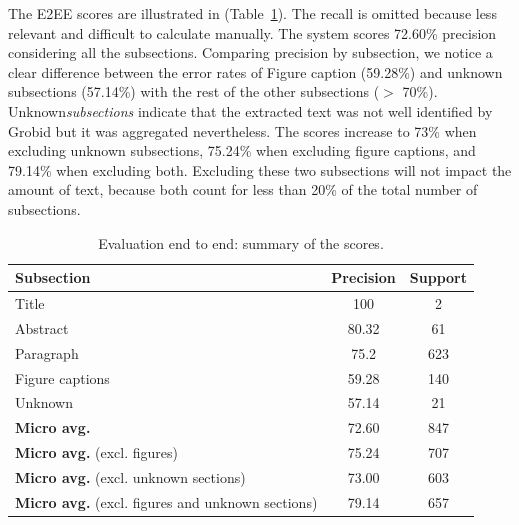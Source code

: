 \documentclass[]{interact}
\theoremstyle{plain}%
\theoremstyle{definition}
\theoremstyle{remark}
\begin{document}
The E2EE scores are illustrated in (Table~\ref{table:end2end-evaluation-summary}).
The recall is omitted because less relevant and difficult to calculate manually.
The system scores 72.60\% precision considering all the subsections.
Comparing precision by subsection, we notice a clear difference between the error rates of Figure caption (59.28\%) and unknown subsections (57.14\%) with the rest of the other subsections ($>$ 70\%).
Unknown\textit{subsections} indicate that the extracted text was not well identified by Grobid but it was aggregated nevertheless.
The scores increase to 73\% when excluding unknown subsections, 75.24\% when excluding figure captions, and 79.14\%  when excluding both.
Excluding these two subsections will not impact the amount of text, because both count for less than 20\% of the total number of subsections.


\begin{table}[ht]
    \centering\small
    \begin{tabular}{l c c}
        \toprule
        \textbf{Subsection}                                      & \textbf{Precision} & \textbf{Support} \\
        \midrule
        Title                                                    & 100                & 2                \\
        Abstract                                                 & 80.32              & 61               \\
        Paragraph                                                & 75.2               & 623              \\
        Figure captions                                          & 59.28              & 140              \\
        Unknown                                                  & 57.14              & 21               \\
        \midrule
        \textbf{Micro avg.}                                      & 72.60              & 847              \\
        \textbf{Micro avg.} (excl. figures)                      & 75.24              & 707              \\
        \textbf{Micro avg.} (excl. unknown sections)             & 73.00              & 603              \\
        \textbf{Micro avg.} (excl. figures and unknown sections) & 79.14              & 657              \\
        \bottomrule
    \end{tabular}
    \caption{Evaluation end to end: summary of the scores. }
    \label{table:end2end-evaluation-summary}
\end{table}
\end{document}

